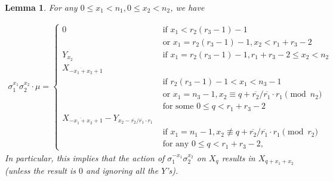 \documentclass[12pt,a4paper]{article}
\newtheorem{lemma}[theorem]{Lemma}
\theoremstyle{definition}
\newcommand{\uo}{\overline{r_2}}
\newcommand{\vo}{\overline{r_1}}
\begin{document}
\begin{lemma}
For any $0\leq x_1<n_1, 0\leq x_2<n_2$, we have
\iffalse
$$
\sigma_1^{x_1}\sigma_2^{x_2}\cdot \mu=
\begin{cases}
0 \quad &\!\begin{aligned} \text{ if }  &x_1<u(t-1)-1\\ &\text{ or } x_1=u(t-1)-1, x_2< v+t-2 \end{aligned}\\
Y_{x_2} \quad &\text{ if } x_1=u(t-1)-1, v+t-2\leq x_2 \\
X_{(-x_1+x_2)\pmod{t}+1} \quad &\!\begin{aligned}\text{ if } & t(u-1)-1< x_1<tu-1 \\&
 \text{ or }  x_1=tu-1, x_2\equiv q+\uo/\vo\cdot v\pmod{tv} \\
 &\text{ for some } 0\leq q<v+t-2  \end{aligned}\\
X_{(-x_1+x_2)\pmod{t}+1}-Y_{(x_2+(t-\uo/\vo)\cdot v)\pmod{n_2}} \quad &\!\begin{aligned}\text{ if } & x_1=tu-1, x_2\not\equiv q+\uo/\vo\cdot v\pmod{tv} \\
&\text{ for any } 0\leq q<v+t-2.\end{aligned}
\end{cases}
$$
\fi

\begin{align*}
\sigma_1^{x_1}\sigma_2^{x_2}\cdot \mu=
\begin{cases}
0   &\text{ if }  x_1<r_2(r_3-1)-1\\
& \text{ or } x_1=r_2(r_3-1)-1, x_2< r_1+r_3-2 \\
Y_{x_2} \quad &\text{ if } x_1=r_2(r_3-1)-1, r_1+r_3-2\leq x_2<n_2 \\
X_{\overline{-x_1+x_2}+1} \\
&\text{ if }  r_2(r_3-1)-1< x_1<n_3-1\\ 
&\text{ or }  x_1=n_3-1, x_2\equiv q+\uo/\vo\cdot r_1\pmod{n_2}\\
& \text{ for some } 0\leq q<r_1+r_3-2  \\
X_{\overline{-x_1+x_2}+1}-Y_{x_2-\uo/\vo\cdot r_1} \\
 &\text{ if }  x_1=n_1-1, x_2\not\equiv q+\uo/\vo\cdot r_1\pmod{r_2}\\
 & \text{ for any } 0\leq q<r_1+r_3-2,
\end{cases}
\end{align*}
In particular, this implies that the action of $\sigma_1^{-x_1}\sigma_2^{x_2}$ on $X_q$ results in $X_{q+x_1+x_2}$ (unless the result is $0$ and ignoring all the $Y$'s).
\end{lemma}
\end{document}
